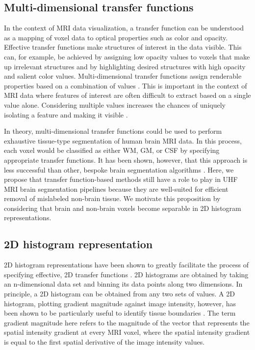 \subsection{Multi-dimensional transfer functions}
In the context of MRI data visualization, a transfer function can be understood as a mapping of voxel data to optical properties such as color and opacity. Effective transfer functions make structures of interest in the data visible. This can, for example, be achieved by assigning low opacity values to voxels that make up irrelevant structures and by highlighting desired structures with high opacity and salient color values. Multi-dimensional transfer functions assign renderable properties based on a combination of values \parencite{Kniss2002, Kindlmann1998, Kniss2005, Kniss2001}. This is important in the context of MRI data where features of interest are often difficult to extract based on a single value alone. Considering multiple values increases the chances of uniquely isolating a feature and making it visible \parencite{Kniss2002}.

In theory, multi-dimensional transfer functions could be used to perform exhaustive tissue-type segmentation of human brain MRI data. In this process, each voxel would be classified as either WM, GM, or CSF by specifying appropriate transfer functions. It has been shown, however, that this approach is less successful than other, bespoke brain segmentation algorithms \parencite{Ljung2016}. Here, we propose that transfer function-based methods still have a role to play in UHF MRI brain segmentation pipelines because they are well-suited for efficient removal of mislabeled non-brain tissue. We motivate this proposition by considering that brain and non-brain voxels become separable in 2D histogram representations.

\subsection{2D histogram representation}
2D histogram representations have been shown to greatly facilitate the process of specifying effective, 2D transfer functions \parencite{Kindlmann1998, Kniss2005}. 2D histograms are obtained by taking an n-dimensional data set and binning its data points along two dimensions. In principle, a 2D histogram can be obtained from any two sets of values. A 2D histogram, plotting gradient magnitude against image intensity, however, has been shown to be particularly useful to identify tissue boundaries \parencite{Kindlmann1998, Kniss2005}. The term gradient magnitude here refers to the magnitude of the vector that represents the spatial intensity gradient at every MRI voxel, where the spatial intensity gradient is equal to the first spatial derivative of the image intensity values.

